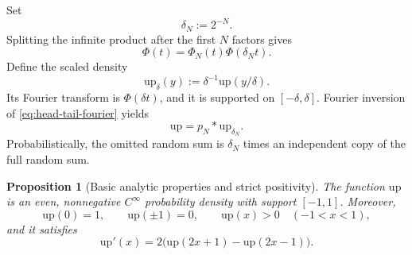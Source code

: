 \documentclass[11pt,oneside]{article}
\numberwithin{equation}{section}
\newtheorem{proposition}[theorem]{Proposition}
\theoremstyle{definition}
\theoremstyle{remark}
\newcommand{\upf}{\mathrm{up}}
\begin{document}
Set
\begin{equation}
 \delta_N:=2^{-N}.
 \label{eq:deltaN}
\end{equation}
Splitting the infinite product after the first $N$ factors gives
\begin{equation}
 \Phi(t)=\Phi_N(t)\Phi(\delta_Nt).
 \label{eq:head-tail-fourier}
\end{equation}
Define the scaled density
\begin{equation}
 \upf_\delta(y):=\delta^{-1}\upf(y/\delta).
 \label{eq:scaled-up}
\end{equation}
Its Fourier transform is $\Phi(\delta t)$, and it is supported on
$[-\delta,\delta]$.  Fourier inversion of \eqref{eq:head-tail-fourier} yields
\begin{equation}
 \boxed{\upf=p_N*\upf_{\delta_N}.}
 \label{eq:head-tail-convolution}
\end{equation}
Probabilistically, the omitted random sum is $\delta_N$ times an independent
copy of the full random sum.


\begin{proposition}[Basic analytic properties and strict positivity]
\label{prop:basic-up}
The function $\upf$ is an even, nonnegative $C^\infty$ probability density with
support $[-1,1]$.  Moreover,
\begin{equation}
 \upf(0)=1,\qquad \upf(\pm1)=0,\qquad \upf(x)>0\quad(-1<x<1),
 \label{eq:basic-up-values}
\end{equation}
and it satisfies
\begin{equation}
 \upf'(x)=2\bigl(\upf(2x+1)-\upf(2x-1)\bigr).
 \label{eq:basic-up-diffeq}
\end{equation}
\end{proposition}
\end{document}
